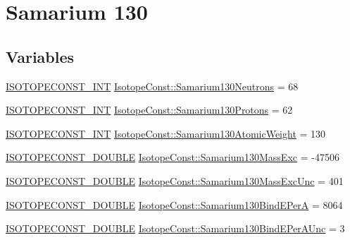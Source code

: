 \hypertarget{group___isotope_const-_samarium-_sm130}{}\section{Samarium 130}
\label{group___isotope_const-_samarium-_sm130}
\subsection*{Variables}
\begin{DoxyCompactItemize}
\item 
\mbox{\hyperlink{group___isotope_const-_macros_ga5f18360b3e99483a35c32d789e62621c}{I\+S\+O\+T\+O\+P\+E\+C\+O\+N\+S\+T\+\_\+\+I\+NT}} \mbox{\hyperlink{group___isotope_const-_samarium-_sm130_ga086ab9cfa5cd38a36b9eb89eff6ea7e4}{Isotope\+Const\+::\+Samarium130\+Neutrons}} = 68
\item 
\mbox{\hyperlink{group___isotope_const-_macros_ga5f18360b3e99483a35c32d789e62621c}{I\+S\+O\+T\+O\+P\+E\+C\+O\+N\+S\+T\+\_\+\+I\+NT}} \mbox{\hyperlink{group___isotope_const-_samarium-_sm130_gabf318ac7a264d4253074f868b42b9844}{Isotope\+Const\+::\+Samarium130\+Protons}} = 62
\item 
\mbox{\hyperlink{group___isotope_const-_macros_ga5f18360b3e99483a35c32d789e62621c}{I\+S\+O\+T\+O\+P\+E\+C\+O\+N\+S\+T\+\_\+\+I\+NT}} \mbox{\hyperlink{group___isotope_const-_samarium-_sm130_ga4292faca181fd8d787ed064357477572}{Isotope\+Const\+::\+Samarium130\+Atomic\+Weight}} = 130
\item 
\mbox{\hyperlink{group___isotope_const-_macros_ga8f45a7272ce02c0b4c65c44636ed719a}{I\+S\+O\+T\+O\+P\+E\+C\+O\+N\+S\+T\+\_\+\+D\+O\+U\+B\+LE}} \mbox{\hyperlink{group___isotope_const-_samarium-_sm130_ga8acb4e894714429ab28448a868153be6}{Isotope\+Const\+::\+Samarium130\+Mass\+Exc}} = -\/47506
\item 
\mbox{\hyperlink{group___isotope_const-_macros_ga8f45a7272ce02c0b4c65c44636ed719a}{I\+S\+O\+T\+O\+P\+E\+C\+O\+N\+S\+T\+\_\+\+D\+O\+U\+B\+LE}} \mbox{\hyperlink{group___isotope_const-_samarium-_sm130_ga3c32cf6b6b8a8405264025953e785231}{Isotope\+Const\+::\+Samarium130\+Mass\+Exc\+Unc}} = 401
\item 
\mbox{\hyperlink{group___isotope_const-_macros_ga8f45a7272ce02c0b4c65c44636ed719a}{I\+S\+O\+T\+O\+P\+E\+C\+O\+N\+S\+T\+\_\+\+D\+O\+U\+B\+LE}} \mbox{\hyperlink{group___isotope_const-_samarium-_sm130_ga149f60a1639d32e26512fa3d25704a5e}{Isotope\+Const\+::\+Samarium130\+Bind\+E\+PerA}} = 8064
\item 
\mbox{\hyperlink{group___isotope_const-_macros_ga8f45a7272ce02c0b4c65c44636ed719a}{I\+S\+O\+T\+O\+P\+E\+C\+O\+N\+S\+T\+\_\+\+D\+O\+U\+B\+LE}} \mbox{\hyperlink{group___isotope_const-_samarium-_sm130_ga1654e5d982c672e58684dffc83e68fdd}{Isotope\+Const\+::\+Samarium130\+Bind\+E\+Per\+A\+Unc}} = 3

\end{DoxyCompactItemize}
